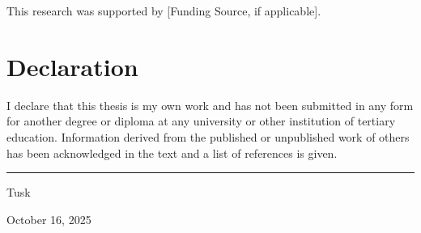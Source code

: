 ﻿\documentclass[12pt,a4paper]{report}
\theoremstyle{plain}
\theoremstyle{definition}
\begin{document}
This research was supported by [Funding Source, if applicable].

\chapter*{Declaration}

I declare that this thesis is my own work and has not been submitted in any form for another degree or diploma at any university or other institution of tertiary education. Information derived from the published or unpublished work of others has been acknowledged in the text and a list of references is given.

\vspace{2cm}

\noindent
\rule{5cm}{0.4pt}

\noindent
Tusk

\noindent
October 16, 2025
\end{document}
